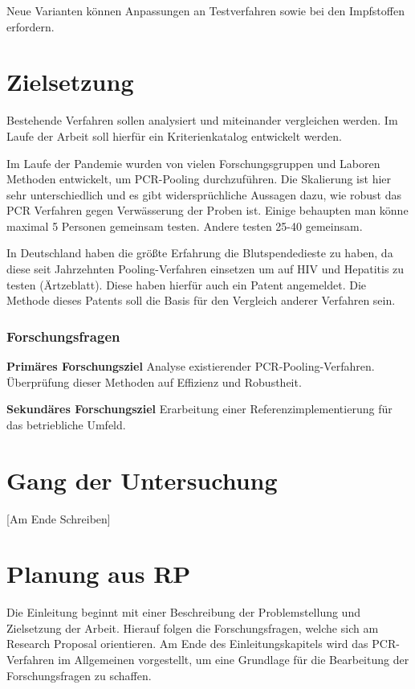 Neue Varianten können Anpassungen an Testverfahren sowie bei den Impfstoffen erfordern.

\section{Zielsetzung}
Bestehende Verfahren sollen analysiert und miteinander vergleichen werden.
Im Laufe der Arbeit soll hierfür ein Kriterienkatalog entwickelt werden.

Im Laufe der Pandemie wurden von vielen Forschungsgruppen und Laboren Methoden entwickelt, um PCR-Pooling durchzuführen. Die Skalierung ist hier sehr unterschiedlich und es gibt widersprüchliche Aussagen dazu, wie robust das PCR Verfahren gegen Verwässerung der Proben ist. Einige behaupten man könne maximal 5 Personen gemeinsam testen. Andere testen 25-40 gemeinsam.

In Deutschland haben die größte Erfahrung die Blutspendedieste zu haben, da diese seit Jahrzehnten Pooling-Verfahren einsetzen um auf HIV und Hepatitis zu testen (Ärtzeblatt). Diese haben hierfür auch ein Patent angemeldet. Die Methode dieses Patents soll die Basis für den Vergleich anderer Verfahren sein.

\subsubsection{Forschungsfragen}
\textbf{Primäres Forschungsziel}\newline
Analyse existierender PCR-Pooling-Verfahren.\newline
Überprüfung dieser Methoden auf Effizienz und Robustheit.

\textbf{Sekundäres Forschungsziel}\newline 
Erarbeitung einer Referenzimplementierung für das betriebliche Umfeld.\newline

\section{Gang der Untersuchung}
[Am Ende Schreiben]



\section{Planung aus RP}
Die Einleitung beginnt mit einer Beschreibung der Problemstellung und Zielsetzung der Arbeit.
Hierauf folgen die Forschungsfragen, welche sich am Research Proposal orientieren.
Am Ende des Einleitungskapitels wird das PCR-Verfahren im Allgemeinen vorgestellt, um eine Grundlage für die Bearbeitung der Forschungsfragen zu schaffen.

